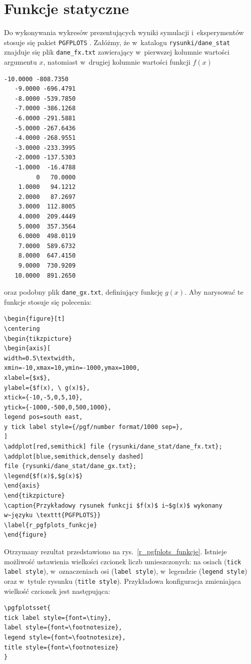 \section{Funkcje statyczne}
Do wykonywania wykresów prezentujących wyniki symulacji i~eksperymentów stosuje się pakiet \verb+PGFPLOTS+ \cite{litFeuersanger2016}. Załóżmy, że w~katalogu \verb+rysunki/dane_stat+ znajduje się plik \verb+dane_fx.txt+ zawierający w~pierwszej kolumnie wartości argumentu $x$, natomiast w~drugiej kolumnie wartości funkcji $f(x)$
\begin{lstlisting}[style=customlatex,frame=single]
  -10.0000 -808.7350
   -9.0000 -696.4791
   -8.0000 -539.7850
   -7.0000 -386.1268
   -6.0000 -291.5881
   -5.0000 -267.6436
   -4.0000 -268.9551
   -3.0000 -233.3995
   -2.0000 -137.5303
   -1.0000  -16.4788
         0   70.0000
    1.0000   94.1212
    2.0000   87.2697
    3.0000  112.8005
    4.0000  209.4449
    5.0000  357.3564
    6.0000  498.0119
    7.0000  589.6732
    8.0000  647.4150
    9.0000  730.9209
   10.0000  891.2650
\end{lstlisting}
oraz podobny plik \verb+dane_gx.txt+, definiujący funkcję $g(x)$. Aby narysować te funkcje stosuje się polecenia:
\begin{lstlisting}[style=customlatex,frame=single]
\begin{figure}[t]
\centering
\begin{tikzpicture}
\begin{axis}[
width=0.5\textwidth,
xmin=-10,xmax=10,ymin=-1000,ymax=1000,
xlabel={$x$},
ylabel={$f(x), \ g(x)$},
xtick={-10,-5,0,5,10},
ytick={-1000,-500,0,500,1000},
legend pos=south east,
y tick label style={/pgf/number format/1000 sep=},
]
\addplot[red,semithick] file {rysunki/dane_stat/dane_fx.txt};
\addplot[blue,semithick,densely dashed]
file {rysunki/dane_stat/dane_gx.txt};
\legend{$f(x)$,$g(x)$}
\end{axis}
\end{tikzpicture}
\caption{Przykładowy rysunek funkcji $f(x)$ i~$g(x)$ wykonany 
w~języku \texttt{PGFPLOTS}}
\label{r_pgfplots_funkcje}
\end{figure}
\end{lstlisting}
Otrzymany rezultat przedstawiono na rys.~\ref{r_pgfplots_funkcje}. Istnieje możliwość ustawienia wielkości czcionek liczb umieszczonych: na osiach (\verb+tick label style+), w~oznaczeniach osi (\verb+label style+), w~legendzie (\verb+legend style+) oraz w~tytule rysunku (\verb+title style+). Przykładowa konfiguracja zmieniająca wielkość czcionek jest następująca:
\begin{lstlisting}[style=customlatex,frame=single]
\pgfplotsset{
tick label style={font=\tiny},
label style={font=\footnotesize},
legend style={font=\footnotesize},
title style={font=\footnotesize}
}
\end{lstlisting}

